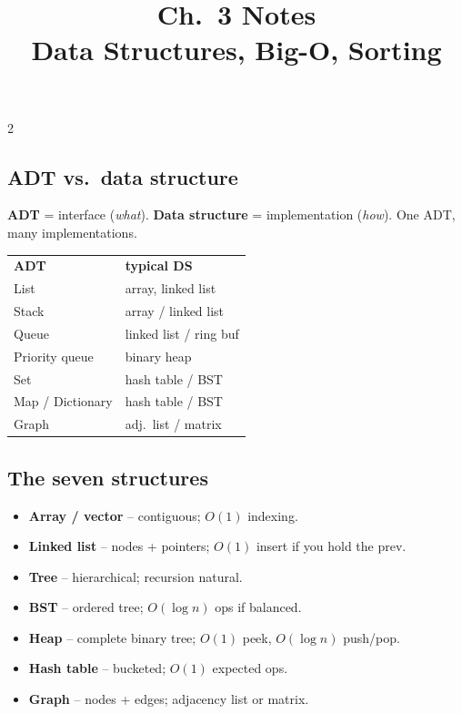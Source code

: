 \documentclass[10pt]{article}
\title{Ch.~3 Notes\\\large Data Structures, Big-O, Sorting}
\author{}
\date{}
\begin{document}
\maketitle
\vspace{-2em}

\begin{multicols}{2}

\subsection*{ADT vs.\ data structure}
\textbf{ADT} = interface (\emph{what}). \textbf{Data structure} =
implementation (\emph{how}). One ADT, many implementations.
\begin{tabular}{@{}ll@{}}
\textbf{ADT}           & \textbf{typical DS}\\
List                   & array, linked list\\
Stack                  & array / linked list\\
Queue                  & linked list / ring buf\\
Priority queue         & binary heap\\
Set                    & hash table / BST\\
Map / Dictionary       & hash table / BST\\
Graph                  & adj.\ list / matrix
\end{tabular}

\subsection*{The seven structures}
\begin{itemize}
    \item \textbf{Array / vector} -- contiguous; $O(1)$ indexing.
    \item \textbf{Linked list} -- nodes + pointers; $O(1)$ insert if you
    hold the prev.
    \item \textbf{Tree} -- hierarchical; recursion natural.
    \item \textbf{BST} -- ordered tree; $O(\log n)$ ops if balanced.
    \item \textbf{Heap} -- complete binary tree; $O(1)$ peek, $O(\log n)$
    push/pop.
    \item \textbf{Hash table} -- bucketed; $O(1)$ expected ops.
    \item \textbf{Graph} -- nodes + edges; adjacency list or matrix.
\end{itemize}


\end{multicols}
\end{document}
